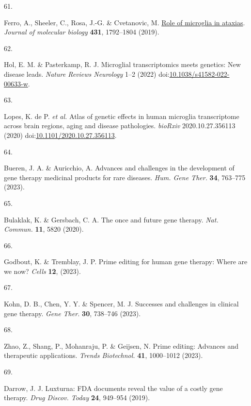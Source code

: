 \documentclass[
]{article}
\newlength{\cslhangindent}
\newlength{\csllabelwidth}
\newenvironment{CSLReferences}[2] %
 {\begin{list}{}{%
  \setlength{\itemindent}{0pt}
  \setlength{\leftmargin}{0pt}
  \setlength{\parsep}{0pt}
  \ifodd #1
   \setlength{\leftmargin}{\cslhangindent}
   \setlength{\itemindent}{-1\cslhangindent}
  \fi
  \setlength{\itemsep}{#2\baselineskip}}}
 {\end{list}}
\newcommand{\CSLLeftMargin}[1]{\parbox[t]{\csllabelwidth}{\strut#1\strut}}
\newcommand{\CSLRightInline}[1]{\parbox[t]{\linewidth - \csllabelwidth}{\strut#1\strut}}
\begin{document}
\begin{CSLReferences}{0}{0}
\CSLLeftMargin{61. }%
\CSLRightInline{Ferro, A., Sheeler, C., Rosa, J.-G. \& Cvetanovic, M.
\href{https://doi.org/10.1016/j.jmb.2019.01.016}{Role of microglia in
ataxias}. \emph{Journal of molecular biology} \textbf{431}, 1792--1804
(2019).}

\CSLLeftMargin{62. }%
\CSLRightInline{Hol, E. M. \& Pasterkamp, R. J. Microglial
transcriptomics meets genetics: New disease leads. \emph{Nature Reviews
Neurology} 1--2 (2022)
doi:\href{https://doi.org/10.1038/s41582-022-00633-w}{10.1038/s41582-022-00633-w}.}

\CSLLeftMargin{63. }%
\CSLRightInline{Lopes, K. de P. \emph{et al.} Atlas of genetic effects
in human microglia transcriptome across brain regions, aging and disease
pathologies. \emph{bioRxiv} 2020.10.27.356113 (2020)
doi:\href{https://doi.org/10.1101/2020.10.27.356113}{10.1101/2020.10.27.356113}.}

\CSLLeftMargin{64. }%
\CSLRightInline{Bueren, J. A. \& Auricchio, A. Advances and challenges
in the development of gene therapy medicinal products for rare diseases.
\emph{Hum. Gene Ther.} \textbf{34}, 763--775 (2023).}

\CSLLeftMargin{65. }%
\CSLRightInline{Bulaklak, K. \& Gersbach, C. A. The once and future gene
therapy. \emph{Nat. Commun.} \textbf{11}, 5820 (2020).}

\CSLLeftMargin{66. }%
\CSLRightInline{Godbout, K. \& Tremblay, J. P. Prime editing for human
gene therapy: Where are we now? \emph{Cells} \textbf{12}, (2023).}

\CSLLeftMargin{67. }%
\CSLRightInline{Kohn, D. B., Chen, Y. Y. \& Spencer, M. J. Successes and
challenges in clinical gene therapy. \emph{Gene Ther.} \textbf{30},
738--746 (2023).}

\CSLLeftMargin{68. }%
\CSLRightInline{Zhao, Z., Shang, P., Mohanraju, P. \& Geijsen, N. Prime
editing: Advances and therapeutic applications. \emph{Trends
Biotechnol.} \textbf{41}, 1000--1012 (2023).}

\CSLLeftMargin{69. }%
\CSLRightInline{Darrow, J. J. Luxturna: {FDA} documents reveal the value
of a costly gene therapy. \emph{Drug Discov. Today} \textbf{24},
949--954 (2019).}


\end{CSLReferences}
\end{document}
